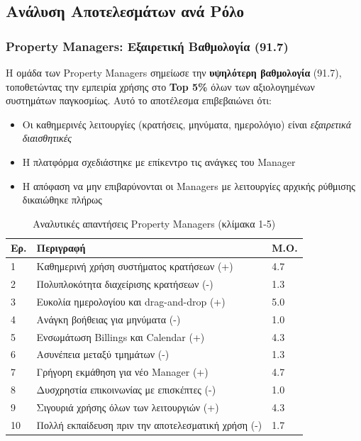 \documentclass[
	12pt, %
	oneside, %
	greek,
	onehalfspacing, %
	liststotoc, %
	toctotoc, %
	parskip, %
	headsepline, %
]{MastersDoctoralThesis} %
\begin{document}
\subsection{Ανάλυση Αποτελεσμάτων ανά Ρόλο}

\subsubsection{Property Managers: Εξαιρετική Βαθμολογία (91.7)}

Η ομάδα των Property Managers σημείωσε την \textbf{υψηλότερη βαθμολογία} (91.7), τοποθετώντας την εμπειρία χρήσης στο \textbf{Top 5\%} όλων των αξιολογημένων συστημάτων παγκοσμίως. Αυτό το αποτέλεσμα επιβεβαιώνει ότι:

\begin{itemize}
    \item Οι καθημερινές λειτουργίες (κρατήσεις, μηνύματα, ημερολόγιο) είναι \textit{εξαιρετικά διαισθητικές}
    \item Η πλατφόρμα σχεδιάστηκε με επίκεντρο τις ανάγκες του Manager
    \item Η απόφαση να μην επιβαρύνονται οι Managers με λειτουργίες αρχικής ρύθμισης δικαιώθηκε πλήρως
\end{itemize}

\begin{table}[H]
\centering
\caption{Αναλυτικές απαντήσεις Property Managers (κλίμακα 1-5)}
\label{tab:sus-managers-detail}
\begin{tabular}{@{}C{1cm}L{9cm}C{1.5cm}@{}}
\toprule
\textbf{Ερ.} & \textbf{Περιγραφή} & \textbf{Μ.Ο.} \\
 & Καθημερινή χρήση συστήματος κρατήσεων (+) & 4.7 \\
2 & Πολυπλοκότητα διαχείρισης κρατήσεων (-) & 1.3 \\
3 & Ευκολία ημερολογίου και drag-and-drop (+) & 5.0 \\
4 & Ανάγκη βοήθειας για μηνύματα (-) & 1.0 \\
5 & Ενσωμάτωση Billings και Calendar (+) & 4.3 \\
6 & Ασυνέπεια μεταξύ τμημάτων (-) & 1.3 \\
7 & Γρήγορη εκμάθηση για νέο Manager (+) & 4.7 \\
8 & Δυσχρηστία επικοινωνίας με επισκέπτες (-) & 1.0 \\
9 & Σιγουριά χρήσης όλων των λειτουργιών (+) & 4.3 \\
10 & Πολλή εκπαίδευση πριν την αποτελεσματική χρήση (-) & 1.7 \\
\bottomrule
\end{tabular}
\end{table}
\end{document}
